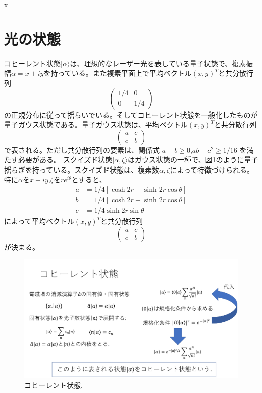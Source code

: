 x\chapter{光の状態
}

コヒーレント状態$|\alpha\rangle$は、理想的なレーザー光を表している量子状態で、複素振幅$\alpha=x+iy$を持っている。また複素平面上で平均ベクトル$(x,y)^T$と共分散行列
$$
\begin{pmatrix}
1/4&0\\
0&1/4
\end{pmatrix}
$$
の正規分布に従って揺らいでいる。そしてコヒーレント状態を一般化したものが量子ガウス状態である。量子ガウス状態は、平均ベクトル$(x,y)^T$と共分散行列
$$
\begin{pmatrix}
a&c\\
c&b
\end{pmatrix}
$$
で表される。ただし共分散行列の要素は、関係式
$a+b\geq 0$,$ab-c^2\geq1/16$
を満たす必要がある。
スクイズド状態$|\alpha,\zeta\rangle$はガウス状態の一種で、図1のように量子揺らぎを持っている。スクイズド状態は、複素数$\alpha,\zeta$によって特徴づけられる。特に$\alpha$を$x+iy$,$\zeta$を$re^{i\theta}$とすると、
\begin{equation}
\begin{split}
a&=1/4[\cosh 2r-\sinh 2r\cos\theta]\\
b&=1/4[\cosh 2r+\sinh 2r\cos\theta]\\
c&=1/4\sinh 2r\sin\theta
\end{split}
\end{equation}
によって平均ベクトル$(x,y)^T$と共分散行列
\begin{equation}
\begin{pmatrix}
a&c\\
c&b
\end{pmatrix}
\end{equation}
が決まる。

\begin{figure}[htbp]
        \centering   
        \includegraphics[width=1.0\textwidth]{img/zemi9.png}
        \caption[sample image (png)]{コヒーレント状態.}
        \label{Fig:1_5_1}
    \end{figure}
    
